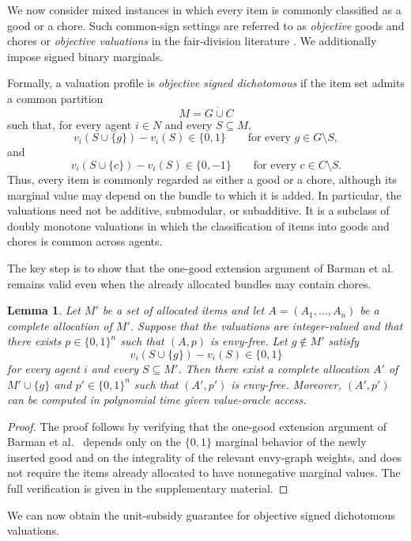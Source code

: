\documentclass[sigconf,anonymous]{aamas}
\theoremstyle{acmplain}
\newtheorem{lemma}[theorem]{Lemma}
\theoremstyle{acmdefinition}
\theoremstyle{acmplain}
\begin{document}
We now consider mixed instances in which every item is commonly classified as a good or a chore. Such common-sign settings are referred to as \emph{objective} goods and chores or \emph{objective valuations} in the fair-division literature \cite{aziz2022fair,bilo2026approximately}. We additionally impose signed binary marginals.

Formally, a valuation profile is \emph{objective signed dichotomous} if the item set admits a common partition
\[
M=G\mathbin{\dot\cup}C
\]such that, for every agent $i\in N$ and every $S\subseteq M$,
\[
v_i(S\cup\{g\})-v_i(S)\in\{0,1\}
\qquad
\text{for every }g\in G\setminus S,
\]
and
\[
v_i(S\cup\{c\})-v_i(S)\in\{0,-1\}
\qquad
\text{for every }c\in C\setminus S.
\]
Thus, every item is commonly regarded as either a good or a chore, although its marginal value may depend on the bundle to which it is added. In particular, the valuations need not be additive, submodular, or subadditive. It is a subclass of doubly monotone valuations in which the classification of items into goods and chores is common across agents.

The key step is to show that the one-good extension argument of Barman et al.~\cite{BKNS22} remains valid even when the already allocated bundles may contain chores.

\begin{lemma}
\label{lem:goods-extension}
Let $M'$ be a set of allocated items and let $A=(A_1,\ldots,A_n)$ be a complete allocation of $M'$. Suppose that the valuations are integer-valued and that there exists $p\in\{0,1\}^n$ such that $(A,p)$ is envy-free. Let $g\notin M'$
satisfy
\[
v_i(S\cup\{g\})-v_i(S)\in\{0,1\}
\]
for every agent $i$ and every $S\subseteq M'$. Then there exist a complete allocation $A'$ of $M'\cup\{g\}$ and $p'\in\{0,1\}^n$ such that $(A',p')$ is envy-free. Moreover, $(A',p')$ can be computed in polynomial time given value-oracle access.
\end{lemma}

\begin{proof}
The proof follows by verifying that the one-good extension argument of Barman et al.~\cite{BKNS22} depends only on the $\{0,1\}$ marginal behavior of the newly inserted good and on the integrality of the relevant envy-graph weights, and does not require the items already allocated to have nonnegative marginal values. The full verification is given in the supplementary material.
\end{proof}


We can now obtain the unit-subsidy guarantee for objective signed dichotomous valuations.
\end{document}
